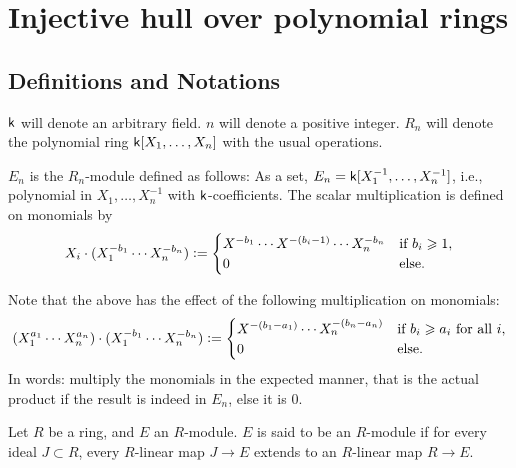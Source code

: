 \section{Injective hull over polynomial rings}

\subsection{Definitions and Notations} 

$\kk$ will denote an arbitrary field. $n$ will denote a positive integer. $R_{n}$ will denote the polynomial ring $\kk[X_{1}, \ldots, X_{n}]$ with the usual operations. 

\begin{defn} \label{defn:En}
	$E_{n}$ is the $R_{n}$-module defined as follows: As a set, $E_{n} = \kk[X_{1}^{-1}, \ldots, X_{n}^{-1}]$, i.e., polynomial in $X_{1}, \ldots, X_{n}^{-1}$ with $\kk$-coefficients. The scalar multiplication is defined on monomials by
	\begin{equation*} 
		X_{i} \cdot (X_{1}^{-b_{1}} \cdots X_{n}^{-b_{n}}) \vcentcolon= 
		\begin{cases}
			X^{-b_{1}} \cdots X^{-(b_{i} - 1)} \cdots X_{n}^{-b_{n}} & \text{if } b_{i} \ge 1, \\
			0 & \text{else}.
		\end{cases}
	\end{equation*}
\end{defn}

\begin{rem}
	Note that the above has the effect of the following multiplication on monomials:
	\begin{equation*} 
		(X_{1}^{a_{1}} \cdots X_{n}^{a_{n}}) \cdot (X_{1}^{-b_{1}} \cdots X_{n}^{-b_{n}}) \vcentcolon= 
		\begin{cases}
			X^{-(b_{1} - a_{1})} \cdots X_{n}^{-(b_{n} - a_{n})} & \text{if } b_{i} \ge a_{i} \text{ for all } i, \\
			0 & \text{else}.
		\end{cases}
	\end{equation*}
	In words: multiply the monomials in the expected manner, that is the actual product if the result is indeed in $E_{n}$, else it is $0$.
\end{rem}

\begin{defn}
	Let $R$ be a ring, and $E$ an $R$-module. $E$ is said to be an  $R$-module if for every ideal $J \subset R$, every $R$-linear map $J \to E$ extends to an $R$-linear map $R \to E$.
\end{defn}

